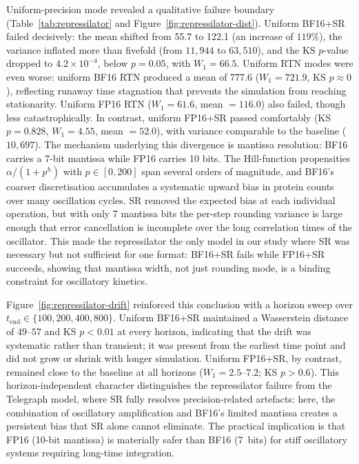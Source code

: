 \documentclass{article}
\begin{document}
Uniform-precision mode revealed a qualitative failure boundary (Table~\ref{tab:repressilator} and Figure~\ref{fig:repressilator-dist}). Uniform BF16+SR failed decisively: the mean shifted from 55.7 to 122.1 (an increase of $119\%$), the variance inflated more than fivefold (from $11{,}944 $ to $63{,}510$), and the KS $p$-value dropped to $4.2 \times 10^{-4}$, below $p = 0.05$, with $W_1 = 66.5$. Uniform RTN modes were even worse: uniform BF16 RTN produced a mean of 777.6 ($W_1 = 721.9$, KS $p \approx 0$), reflecting runaway time stagnation that prevents the simulation from reaching stationarity. Uniform FP16 RTN ($W_1 = 61.6$, mean $= 116.0$) also failed, though less catastrophically. In contrast, uniform FP16+SR passed comfortably (KS $p = 0.828$, $W_1 = 4.55$, mean $= 52.0$), with variance comparable to the baseline ($10{,}697$). The mechanism underlying this divergence is mantissa resolution: BF16 carries a 7-bit mantissa while FP16 carries 10 bits. The Hill-function propensities $\alpha / (1 + p^h)$ with $p \in [0, 200]$ span several orders of magnitude, and BF16's coarser discretisation accumulates a systematic upward bias in protein counts over many oscillation cycles. SR removed the expected bias at each individual operation, but with only 7 mantissa bits the per-step rounding variance is large enough that error cancellation is incomplete over the long correlation times of the oscillator. This made the repressilator the only model in our study where SR was necessary but not sufficient for one format: BF16+SR fails while FP16+SR succeeds, showing that mantissa width, not just rounding mode, is a binding constraint for oscillatory kinetics.

Figure~\ref{fig:repressilator-drift} reinforced this conclusion with a horizon sweep over $t_{\mathrm{end}} \in \{100, 200, 400, 800\}$. Uniform BF16+SR maintained a Wasserstein distance of $49$--$57$ and KS $p < 0.01$ at every horizon, indicating that the drift was systematic rather than transient; it was present from the earliest time point and did not grow or shrink with longer simulation. Uniform FP16+SR, by contrast, remained close to the baseline at all horizons ($W_1 = 2.5$--$7.2$; KS $p > 0.6$). This horizon-independent character distinguishes the repressilator failure from the Telegraph model, where SR fully resolves precision-related artefacts: here, the combination of oscillatory amplification and BF16's limited mantissa creates a persistent bias that SR alone cannot eliminate. The practical implication is that FP16 (10-bit mantissa) is materially safer than BF16 (7~bits) for stiff oscillatory systems requiring long-time integration.
\end{document}
